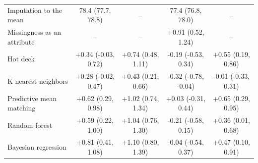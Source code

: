\documentclass{article}
\begin{document}
\begin{table}
\begin{tabular}{lcccc}
\midrule
Imputation to the mean & 78.4 (77.7, 78.8) & -- & 77.4 (76.8, 78.0) & -- \\ 
Missingness as an attribute & -- & -- & +0.91 (0.52, 1.24) & -- \\ 
Hot deck & +0.34 (-0.03, 0.72) & +0.74 (0.48, 1.11) & -0.19 (-0.53, 0.34) & +0.55 (0.19, 0.86) \\ 
K-nearest-neighbors & +0.28 (-0.02, 0.47) & +0.43 (0.21, 0.66) & -0.32 (-0.78, -0.04) & -0.01 (-0.33, 0.31) \\ 
Predictive mean matching & +0.62 (0.29, 0.98) & +1.02 (0.74, 1.34) & +0.03 (-0.31, 0.44) & +0.65 (0.29, 0.95) \\ 
Random forest & +0.59 (0.22, 1.00) & +1.04 (0.76, 1.30) & -0.21 (-0.58, 0.15) & +0.36 (0.01, 0.68) \\ 
Bayesian regression & +0.81 (0.41, 1.08) & +1.10 (0.80, 1.39) & -0.04 (-0.54, 0.37) & +0.47 (0.10, 0.91) \\ 
\bottomrule
\end{tabular} 
 \end{table}

\clearpage
\end{document}
